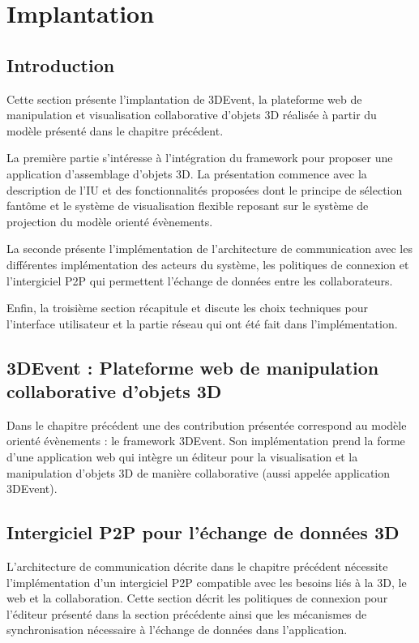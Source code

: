 
\chapter{Implantation}
\chaptertable

\section{Introduction} 
Cette section présente l'implantation de 3DEvent, la plateforme web de 
manipulation et visualisation collaborative d'objets 3D réalisée à partir du modèle 
présenté dans le chapitre précédent.

La première partie s'intéresse à l'intégration 
du framework pour proposer une application d'assemblage d'objets 3D. La 
présentation commence avec la description de l'\gls{IU} et des fonctionnalités 
proposées dont le principe de sélection fantôme et le système de visualisation 
flexible reposant sur le système de projection du modèle orienté évènements. 

La seconde présente l'implémentation de l'architecture de communication avec les 
différentes implémentation des acteurs du système, les politiques de connexion et 
l'intergiciel \gls{P2P} qui permettent l'échange de données entre les collaborateurs.

Enfin, la troisième section récapitule et discute les choix techniques pour 
l'interface utilisateur et la partie réseau qui ont été fait dans l'implémentation.


\section{3DEvent : Plateforme web de manipulation collaborative d'objets 3D}
Dans le chapitre précédent une des contribution présentée correspond au 
modèle orienté évènements : le \gls{framework} 3DEvent. 
Son implémentation prend la forme d'une application web qui intègre un éditeur 
pour la visualisation et la manipulation d'objets 3D de manière collaborative (aussi 
appelée \og application 3DEvent\fg{}).



\section{Intergiciel P2P pour l'échange de données 3D}

L'architecture de communication décrite dans le chapitre précédent nécessite 
l'implémentation d'un intergiciel P2P compatible avec les besoins liés à la 3D, le 
web et la collaboration. Cette section décrit les politiques de connexion pour 
l'éditeur présenté dans la section précédente ainsi que les mécanismes de 
synchronisation nécessaire à l'échange de données dans l'application. 

